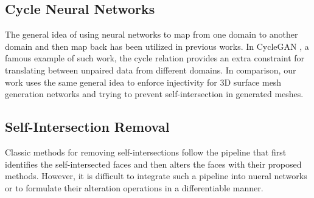 \subsection{Cycle Neural Networks}
The general idea of using neural networks to map from one domain to another domain and then map back has been utilized in previous works. In CycleGAN \cite{CycleGAN2017}, a famous example of such work, the cycle relation provides an extra constraint for translating between unpaired data from different domains. In comparison, our work uses the same general idea to enforce injectivity for 3D surface mesh generation networks and trying to prevent self-intersection in generated meshes. 

\subsection{Self-Intersection Removal}
Classic methods  for removing self-intersections follow the pipeline that first identifies the self-intersected faces and then alters the faces with their proposed methods. However, it is difficult to integrate such a pipeline into nueral networks or to formulate their alteration operations in a differentiable manner. 

